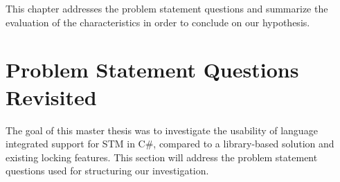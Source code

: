 



This chapter addresses the problem statement questions and summarize the evaluation of the characteristics in order to conclude on our hypothesis. %

\label{chap:conclusion}

\section{Problem Statement Questions Revisited}
The goal of this master thesis was to investigate the usability of language integrated support for \ac{STM} in C\#, compared to a library-based solution and existing locking features. This section will address the problem statement questions used for structuring our investigation.

